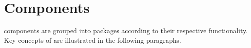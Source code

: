 \newpage
\chapter{\salespoint Components}
\salespoint{} components are grouped into packages according to their respective functionality.
Key concepts of \salespoint{} are illustrated in the following paragraphs.











